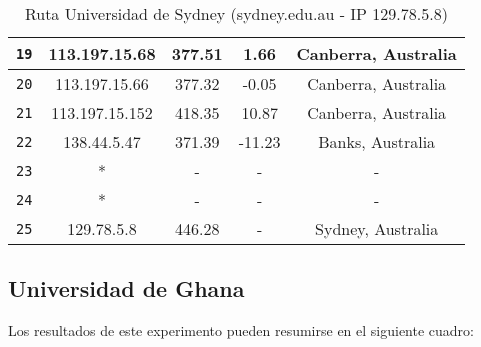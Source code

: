 \begin{table}[ht]
\begin{center}
\begin{tabular}{|c|c|c|c|c|}
    \texttt{19} & 113.197.15.68   & 377.51  & 1.66    & Canberra, Australia   \\ \hline
    \texttt{20} & 113.197.15.66   & 377.32  & -0.05   & Canberra, Australia   \\ \hline
    \texttt{21} & 113.197.15.152  & 418.35  & 10.87   & Canberra, Australia    \\ \hline
    \texttt{22} & 138.44.5.47     & 371.39  & -11.23  & Banks, Australia   \\ \hline
    \texttt{23} & *               & -       & -       & -                \\ \hline
    \texttt{24} & *               & -       & -       & -   \\ \hline
    \texttt{25} & 129.78.5.8      & 446.28  & -       & Sydney, Australia   \\ \hline
    \end{tabular}
    \caption{Ruta Universidad de Sydney (sydney.edu.au - IP 129.78.5.8)}
\end{center}\end{table}


\subsection{Universidad de Ghana}

Los resultados de este experimento pueden resumirse en el siguiente cuadro:

